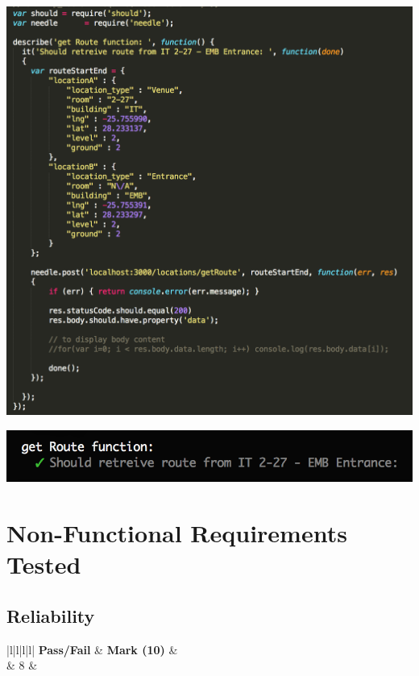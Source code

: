 \documentclass[runningheads,a4paper]{article}
\newcommand{\cmark}{\ding{51}}%
\begin{document}
	\begin{center}
	\begin{minipage}{0.48\linewidth}
		\includegraphics[width=\linewidth]{fig/getroute-code1.png}
	\end{minipage}
	\hfill
	\begin{minipage}{0.48\linewidth}
		\includegraphics[width=\linewidth]{fig/getroute-term1.png}
	\end{minipage}
	\hfill
	
	\end{center}
	
	\section{Non-Functional Requirements Tested}
	\subsection{Reliability}
	\begin{tabular}{|l|l|l|l|}
		\hline
		\textbf{Pass/Fail} & \textbf{Mark (10)} &                                                                                                                                                               \\ 
		\hline
		\cmark  &   8  &  \\ \hline
	\end{tabular}
	
\end{document}
